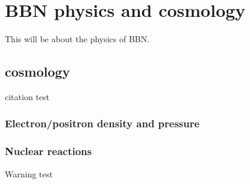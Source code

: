
\chapter{BBN physics and cosmology}
\label{chap:theory}

This will be about the physics of BBN.

\section{cosmology}
\label{sec:cosmology}

citation test\textcite{kww}

\subsection{Electron/positron density and pressure}

\lipsum


\subsection{Nuclear reactions}
\label{sec:nucleartheory}

Warning test

\lipsum
